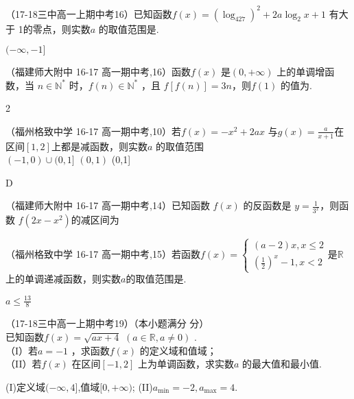 \item
（17-18三中高一上期中考16）已知函数$f(x)=(\log_427)^2+2a\log_2x+1 $ 有大于 1的零点，则实数$a$ 的取值范围是\tk.
\begin{answers}
$(-\infty,-1]$
\end{answers}


\item
（福建师大附中 16-17 高一期中考,16）函数$f(x)$ 是$(0,+\infty)$ 上的单调增函数，当 $n\in \mathbb{N}^*$ 时，$f(n)\in\mathbb{N}^*$ ，且 $f[f(n) ] =3n$，则$f(1)$ 的值为\tk.\\
\begin{answers}2\end{answers}


\item
（福州格致中学 16-17 高一期中考,10）若$f(x)=-x^2+2ax $
 与$g(x)=\frac a{x+1} $在区间$[1,2] $上都是减函数，则实数$a $ 的取值范围\xz\\
 		{$(-1,0)\cup (0,1]$}
        {$(0,1) $}
        {(0,1]}
 \begin{answer}      D\end{answer}

\item
（福建师大附中 16-17 高一期中考,14）已知函数 $f(x)$ 的反函数是 $y=\frac{1}{3^x}$，则函数 $f(2x-x^2) $的减区间为\tk

\item
（福州格致中学 16-17 高一期中考,15）若函数$f(x)=\begin{cases}(a-2)x,x\leq2\\(\frac{1}{2})^x-1,x<2\end{cases}$是$\mathbb{R}$上的单调递减函数，则实数$a$的取值范围是\tk.
\begin{answers}
$a\leq\frac{13}{8}$
\end{answers}

\item
（17-18三中高一上期中考19）（本小题满分 分）\\
已知函数$f(x)=\sqrt{ax+4}$ $(a\in\mathbb{R},a\neq0)$  .\\
（I）若$a=-1$ ，求函数$f(x)$ 的定义域和值域；\\  
（II）若$f(x)$ 在区间$[-1,2] $ 上为单调函数，求实数$a$ 的最大值和最小值.\\
\begin{answers}
(I)定义域$(-\infty,4]$,值域$[0,+\infty)$;
(II)$a_{\min}=-2,a_{\max}=4 $.
\end{answers}





